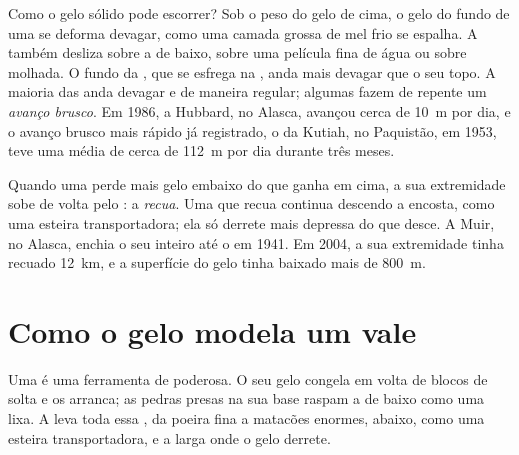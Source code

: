 Como o gelo sólido pode escorrer? Sob o peso do gelo de cima, o gelo do
fundo de uma  se deforma devagar, como uma camada grossa de mel
frio se espalha. A  também desliza sobre a  de baixo, sobre
uma película fina de água ou sobre  molhada. O fundo da , que
se esfrega na , anda mais devagar que o seu topo. A maioria das
 anda devagar e de maneira regular; algumas fazem de repente um
\emph{avanço brusco}. Em 1986, a  Hubbard, no Alasca, avançou
cerca de \qty{10}{m} por dia, e o avanço brusco mais rápido já
registrado, o da  Kutiah, no Paquistão, em 1953, teve uma média de
cerca de \qty{112}{m} por dia durante três meses.

Quando uma  perde mais gelo embaixo do que ganha em cima, a sua
extremidade sobe de volta pelo : a  \emph{recua}. Uma 
que recua continua descendo a encosta, como uma esteira transportadora;
ela só derrete mais depressa do que desce. A  Muir, no Alasca,
enchia o seu  inteiro até o  em 1941. Em 2004, a sua extremidade
tinha recuado \qty{12}{km}, e a superfície do gelo tinha baixado mais de
\qty{800}{m}.

\section{Como o gelo modela um vale}

Uma  é uma ferramenta de  poderosa. O seu gelo congela em
volta de blocos de  solta e os arranca; as pedras presas na sua base
raspam a  de baixo como uma lixa. A  leva toda essa , da
poeira fina a matacões enormes,  abaixo, como uma esteira
transportadora, e a larga onde o gelo derrete.


